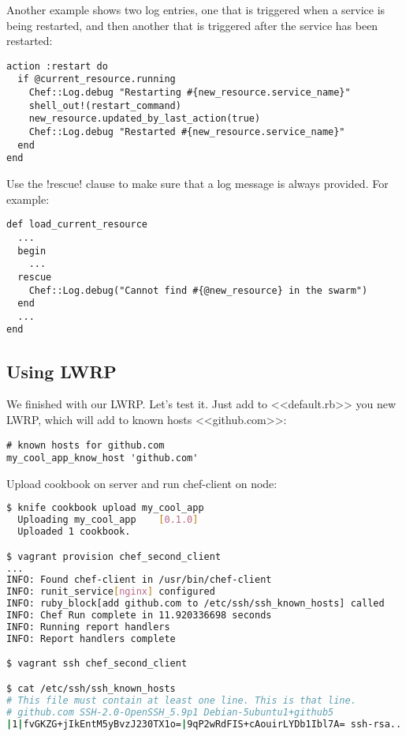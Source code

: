 Another example shows two log entries, one that is triggered when a service is being restarted, and then another that is triggered after the service has been restarted:

\begin{lstlisting}[label=lst:cookbook-lwrp-logs3]
action :restart do
  if @current_resource.running
    Chef::Log.debug "Restarting #{new_resource.service_name}"
    shell_out!(restart_command)
    new_resource.updated_by_last_action(true)
    Chef::Log.debug "Restarted #{new_resource.service_name}"
  end
end
\end{lstlisting}

Use the \inline!rescue! clause to make sure that a log message is always provided. For example:

\begin{lstlisting}[label=lst:cookbook-lwrp-logs4]
def load_current_resource
  ...
  begin
    ...
  rescue
    Chef::Log.debug("Cannot find #{@new_resource} in the swarm")
  end
  ...
end
\end{lstlisting}

\subsection{Using LWRP}

We finished with our LWRP. Let's test it. Just add to <<default.rb>> you new LWRP, which will add to known hosts <<github.com>>:

\begin{lstlisting}[label=lst:cookbook-lwrp5,title=my-server-cloud/site-cookbooks/my\_cool\_app/recipes/default.rb]
# known hosts for github.com
my_cool_app_know_host 'github.com'
\end{lstlisting}

Upload cookbook on server and run chef-client on node:

\begin{lstlisting}[language=Bash,label=lst:cookbook-lwrp6]
$ knife cookbook upload my_cool_app
  Uploading my_cool_app    [0.1.0]
  Uploaded 1 cookbook.

$ vagrant provision chef_second_client
...
INFO: Found chef-client in /usr/bin/chef-client
INFO: runit_service[nginx] configured
INFO: ruby_block[add github.com to /etc/ssh/ssh_known_hosts] called
INFO: Chef Run complete in 11.920336698 seconds
INFO: Running report handlers
INFO: Report handlers complete

$ vagrant ssh chef_second_client

$ cat /etc/ssh/ssh_known_hosts
# This file must contain at least one line. This is that line.
# github.com SSH-2.0-OpenSSH_5.9p1 Debian-5ubuntu1+github5
|1|fvGKZG+jIkEntM5yBvzJ230TX1o=|9qP2wRdFIS+cAouirLYDb1Ibl7A= ssh-rsa...
\end{lstlisting}

